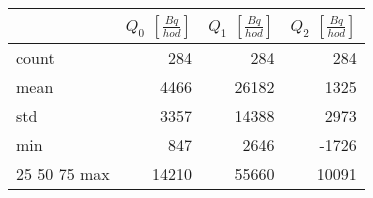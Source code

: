 \begin{tabular}{lrrr}
\toprule
{} &  $Q_0$ $\left[\si{\frac{Bq}{hod}}\right]$ &  $Q_1$ $\left[\si{\frac{Bq}{hod}}\right]$ &  $Q_2$ $\left[\si{\frac{Bq}{hod}}\right]$ \\
\midrule
count &                                       284 &                                       284 &                                       284 \\
mean  &                                      4466 &                                     26182 &                                      1325 \\
std   &                                      3357 &                                     14388 &                                      2973 \\
min   &                                       847 &                                      2646 &                                     -1726 \\
25%
50%
75%
max   &                                     14210 &                                     55660 &                                     10091 \\
\bottomrule
\end{tabular}
